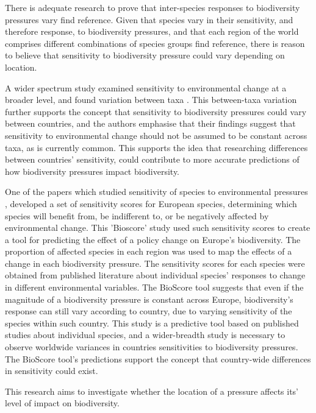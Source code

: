 \documentclass[11pt, a4paper, titlepage]{article}
\begin{document}
	There is adequate research to prove that inter-species responses to biodiversity pressures vary {find reference}. Given that species vary in their sensitivity, and therefore response, to biodiversity pressures, and that each region of the world comprises different combinations of species groups {find reference}, there is reason to believe that sensitivity to biodiversity pressure could vary depending on location. \newline
	
	A wider spectrum study examined sensitivity to environmental change at a broader level, and found variation between taxa \citep{sunday2015species}. This between-taxa variation further supports the concept that sensitivity to biodiversity pressures could vary between countries, and the authors emphasise that their findings suggest that sensitivity to environmental change should not be assumed to be constant across taxa, as is currently common. This supports the idea that researching differences between countries' sensitivity, could contribute to more accurate predictions of how biodiversity pressures impact biodiversity. \newline
	
	One of the papers which studied sensitivity of species to environmental pressures \citep{louette2010bioscore}, developed a set of sensitivity scores for European species, determining which species will benefit from, be indifferent to, or be negatively affected by environmental change. This 'Bioscore' study used such sensitivity scores to create a tool for predicting the effect of a policy change on Europe's biodiversity. The proportion of  affected species in each region was used to map the effects of a change in each biodiversity pressure. The sensitivity scores for each species were obtained from published literature about individual species' responses to change in different environmental variables. The BioScore tool suggests that even if the magnitude of a biodiversity pressure is constant across Europe, biodiversity's response can still vary according to country, due to varying sensitivity of the species within such country. This study is a predictive tool based on published studies about individual species, and a wider-breadth study is necessary to observe worldwide variances in countries sensitivities to biodiversity pressures. The BioScore tool's predictions support the concept that country-wide differences in sensitivity could exist. \newline
	
	This research aims to investigate whether the location of a pressure affects its' level of impact on biodiversity. \newline
\end{document}
